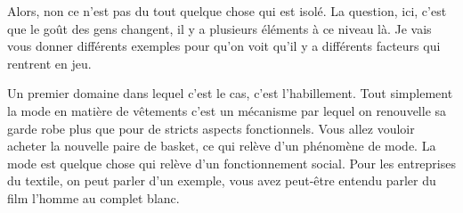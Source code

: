 \begin{small}
Alors, non ce n'est pas du tout quelque chose qui est isolé. La question, ici, c'est que le goût des gens changent, il y a plusieurs éléments à ce niveau là. Je vais vous donner différents exemples pour qu'on voit qu'il y a différents facteurs qui rentrent en jeu. 

Un premier domaine dans lequel c'est le cas, c'est l'habillement. Tout simplement la mode en matière de vêtements c'est un mécanisme par lequel on renouvelle sa garde robe plus que pour de stricts aspects fonctionnels.  Vous allez vouloir acheter la nouvelle paire de basket, ce qui relève d'un phénomène de mode. La mode est quelque chose qui relève d'un fonctionnement social. Pour les entreprises du textile, on peut parler d'un exemple, vous avez peut-être entendu parler du film l'homme au complet blanc. 




\end{small}
